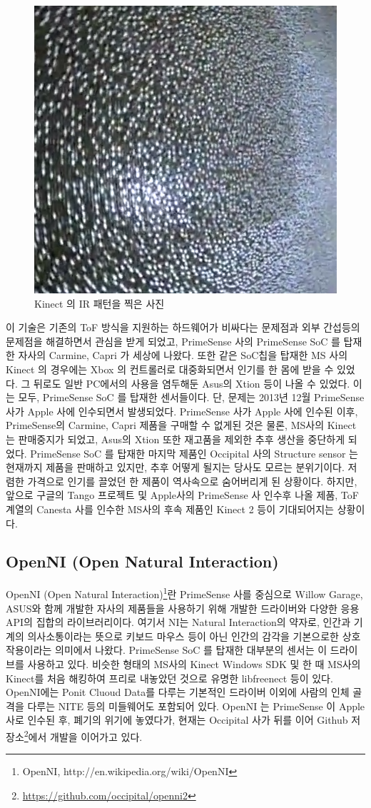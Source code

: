 \begin{figure}[h]
\label{fig:irpattern}
\centering\includegraphics[width=0.4\columnwidth]{pictures/chapter9/irpattern.png}
\caption{Kinect 의 IR 패턴을 찍은 사진}
\end{figure}

이 기술은 기존의 ToF 방식을 지원하는 하드웨어가 비싸다는 문제점과 외부 간섭등의 문제점을 해결하면서 관심을 받게 되었고, PrimeSense 사의 PrimeSense SoC 를 탑재한 자사의 Carmine, Capri 가 세상에 나왔다. 또한 같은 SoC칩을 탑재한 MS 사의 Kinect 의 경우에는 Xbox 의 컨트롤러로 대중화되면서 인기를 한 몸에 받을 수 있었다. 그 뒤로도 일반 PC에서의 사용을 염두해둔 Asus의 Xtion 등이 나올 수 있었다. 이는 모두,  PrimeSense SoC 를 탑재한 센서들이다. 단, 문제는 2013년 12월 PrimeSense 사가 Apple 사에 인수되면서 발생되었다. PrimeSense 사가 Apple 사에 인수된 이후, PrimeSense의 Carmine, Capri 제품을 구매할 수 없게된 것은 물론, MS사의 Kinect는 판매중지가 되었고, Asus의 Xtion 또한 재고품을 제외한 추후 생산을 중단하게 되었다. PrimeSense SoC 를 탑재한 마지막 제품인 Occipital 사의 Structure sensor 는 현재까지 제품을 판매하고 있지만, 추후 어떻게 될지는 당사도 모르는 분위기이다. 저렴한 가격으로 인기를 끌었던 한 제품이 역사속으로 숨어버리게 된 상황이다. 하지만, 앞으로 구글의 Tango 프로젝트 및 Apple사의 PrimeSense 사 인수후 나올 제품, ToF 계열의 Canesta 사를 인수한 MS사의 후속 제품인 Kinect 2 등이 기대되어지는 상황이다.

\subsection{OpenNI (Open Natural Interaction)}

OpenNI (Open Natural Interaction)\footnote{OpenNI, http://en.wikipedia.org/wiki/OpenNI}란 PrimeSense 사를 중심으로 Willow Garage, ASUS와 함께 개발한 자사의 제품들을 사용하기 위해 개발한 드라이버와 다양한 응용 API의 집합의 라이브러리이다. 여기서 NI는 Natural Interaction의 약자로, 인간과 기계의 의사소통이라는 뜻으로 키보드 마우스 등이 아닌 인간의 감각을 기본으로한 상호작용이라는 의미에서 나왔다. PrimeSense SoC 를 탑재한 대부분의 센서는 이 드라이브를 사용하고 있다. 비슷한 형태의 MS사의 Kinect Windows SDK 및 한 때 MS사의 Kinect를 처음 해킹하여 프리로 내놓았던 것으로 유명한 libfreenect 등이 있다. OpenNI에는 Ponit Cluoud Data를 다루는 기본적인 드라이버 이외에 사람의 인체 골격을 다루는 NITE 등의 미들웨어도 포함되어 있다. OpenNI 는 PrimeSense 이 Apple 사로 인수된 후, 폐기의 위기에 놓였다가, 현재는 Occipital 사가 뒤를 이어 Github 저장소\footnote{\url{https://github.com/occipital/openni2}}에서 개발을 이어가고 있다.

